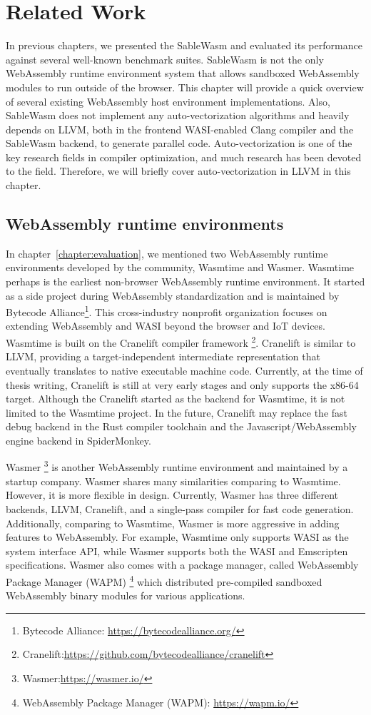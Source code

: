 \chapter{Related Work}
\label{chapter:related-work}

In previous chapters, we presented the SableWasm and evaluated its performance
against several well-known benchmark suites. SableWasm is not the only
WebAssembly runtime environment system that allows sandboxed WebAssembly
modules to run outside of the browser. This chapter will provide a quick
overview of several existing WebAssembly host environment implementations. Also,
SableWasm does not implement any auto-vectorization algorithms and heavily
depends on LLVM, both in the frontend WASI-enabled Clang compiler and the
SableWasm backend, to generate parallel code. Auto-vectorization is one of the
key research fields in compiler optimization, and much research has been
devoted to the field. Therefore, we will briefly cover auto-vectorization
in LLVM in this chapter.

\section*{WebAssembly runtime environments}

In chapter~\ref{chapter:evaluation}, we mentioned two WebAssembly runtime
environments developed by the community, Wasmtime and Wasmer. Wasmtime perhaps
is the earliest non-browser WebAssembly runtime environment. It started as a
side project during WebAssembly standardization and is maintained by Bytecode
Alliance\footnote{Bytecode Alliance: \url{https://bytecodealliance.org/}}. This
cross-industry nonprofit organization focuses on extending WebAssembly and WASI
beyond the browser and IoT devices. Wasmtime is built on the Cranelift compiler
framework
\footnote{Cranelift:\url{https://github.com/bytecodealliance/cranelift}}.
Cranelift is similar to LLVM, providing a target-independent intermediate
representation that eventually translates to native executable machine code.
Currently, at the time of thesis writing, Cranelift is still at very early
stages and only supports the x86-64 target. Although the Cranelift started as
the backend for Wasmtime, it is not limited to the Wasmtime project. In the
future, Cranelift may replace the fast debug backend in the Rust compiler
toolchain and the Javascript/WebAssembly engine backend in SpiderMonkey.

Wasmer \footnote{Wasmer:\url{https://wasmer.io/}} is another WebAssembly
runtime environment and maintained by a startup company. Wasmer shares many
similarities comparing to Wasmtime. However, it is more flexible in design.
Currently, Wasmer has three different backends, LLVM, Cranelift, and a
single-pass compiler for fast code generation. Additionally, comparing to
Wasmtime, Wasmer is more aggressive in adding features to WebAssembly. For
example, Wasmtime only supports WASI as the system interface API, while Wasmer
supports both the WASI and Emscripten specifications. Wasmer also comes with a
package manager, called WebAssembly Package Manager (WAPM)
\footnote{WebAssembly Package Manager (WAPM): \url{https://wapm.io/}} which
distributed pre-compiled sandboxed WebAssembly binary modules for various
applications.


